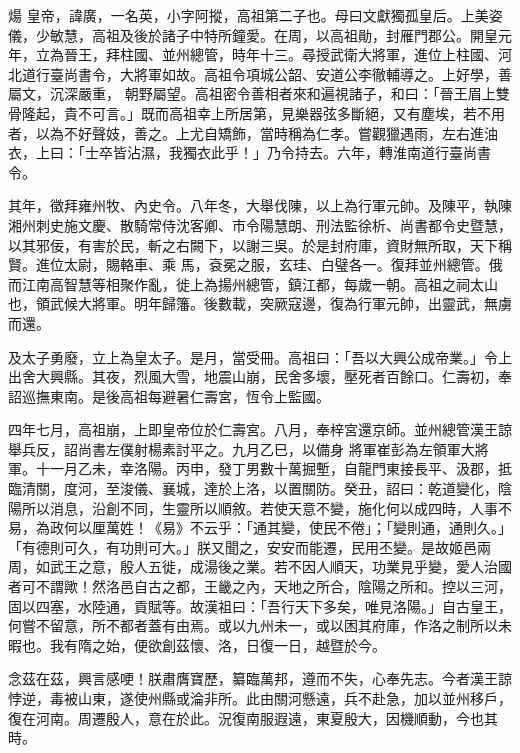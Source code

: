 
\begin{pinyinscope}

 煬
 皇帝，諱廣，一名英，小字阿摐，高祖第二子也。母曰文獻獨孤皇后。上美姿儀，少敏慧，高祖及後於諸子中特所鐘愛。在周，以高祖勛，封雁門郡公。開皇元年，立為晉王，拜柱國、並州總管，時年十三。尋授武衛大將軍，進位上柱國、河北道行臺尚書令，大將軍如故。高祖令項城公韶、安道公李徹輔導之。上好學，善屬文，沉深嚴重，
 朝野屬望。高祖密令善相者來和遍視諸子，和曰：「晉王眉上雙骨隆起，貴不可言。」既而高祖幸上所居第，見樂器弦多斷絕，又有塵埃，若不用者，以為不好聲妓，善之。上尤自矯飾，當時稱為仁孝。嘗觀獵遇雨，左右進油衣，上曰：「士卒皆沾濕，我獨衣此乎！」乃令持去。六年，轉淮南道行臺尚書令。



 其年，徵拜雍州牧、內史令。八年冬，大舉伐陳，以上為行軍元帥。及陳平，執陳湘州刺史施文慶、散騎常侍沈客卿、市令陽慧朗、刑法監徐析、尚書都令史暨慧，以其邪佞，有害於民，斬之右闕下，以謝三吳。於是封府庫，資財無所取，天下稱賢。進位太尉，賜輅車、乘
 馬，袞冕之服，玄珪、白璧各一。復拜並州總管。俄而江南高智慧等相聚作亂，徙上為揚州總管，鎮江都，每歲一朝。高祖之祠太山也，領武候大將軍。明年歸籓。後數載，突厥寇邊，復為行軍元帥，出靈武，無虜而還。



 及太子勇廢，立上為皇太子。是月，當受冊。高祖曰：「吾以大興公成帝業。」令上出舍大興縣。其夜，烈風大雪，地震山崩，民舍多壞，壓死者百餘口。仁壽初，奉詔巡撫東南。是後高祖每避暑仁壽宮，恆令上監國。



 四年七月，高祖崩，上即皇帝位於仁壽宮。八月，奉梓宮還京師。並州總管漢王諒舉兵反，詔尚書左僕射楊素討平之。九月乙巳，以備身
 將軍崔彭為左領軍大將軍。十一月乙未，幸洛陽。丙申，發丁男數十萬掘塹，自龍門東接長平、汲郡，抵臨清關，度河，至浚儀、襄城，達於上洛，以置關防。癸丑，詔曰：乾道變化，陰陽所以消息，沿創不同，生靈所以順敘。若使天意不變，施化何以成四時，人事不易，為政何以厘萬姓！《易》不云乎：「通其變，使民不倦」；「變則通，通則久。」「有德則可久，有功則可大。」朕又聞之，安安而能遷，民用丕變。是故姬邑兩周，如武王之意，殷人五徙，成湯後之業。若不因人順天，功業見乎變，愛人治國者可不謂歟！然洛邑自古之都，王畿之內，天地之所合，陰陽之所和。控以三河，
 固以四塞，水陸通，貢賦等。故漢祖曰：「吾行天下多矣，唯見洛陽。」自古皇王，何嘗不留意，所不都者蓋有由焉。或以九州未一，或以困其府庫，作洛之制所以未暇也。我有隋之始，便欲創茲懷、洛，日復一日，越暨於今。



 念茲在茲，興言感哽！朕肅膺寶歷，纂臨萬邦，遵而不失，心奉先志。今者漢王諒悖逆，毒被山東，遂使州縣或淪非所。此由關河懸遠，兵不赴急，加以並州移戶，復在河南。周遷殷人，意在於此。況復南服遐遠，東夏殷大，因機順動，今也其時。




\end{pinyinscope}
